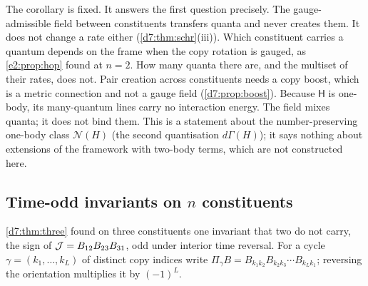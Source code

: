 The corollary is fixed. It answers the first question precisely. The gauge-admissible field between constituents transfers quanta and never
creates them. It does not change a rate either (\cref{d7:thm:schr}(iii)). Which constituent carries a quantum depends on the frame
when the copy rotation is gauged, as \cref{e2:prop:hop} found at $n=2$. How many quanta there are, and the multiset of their rates, does not.
Pair creation across constituents needs a copy boost, which is a metric connection and not a gauge field (\cref{d7:prop:boost}).
Because $\mathsf H$ is one-body, its many-quantum lines carry no interaction energy. The field mixes quanta; it does not bind them. This is a
statement about the number-preserving one-body class $\mathcal N(H)$ (the second quantisation $d\Gamma(H)$); it says nothing about extensions
of the framework with two-body terms, which are not constructed here.

\subsection{\texorpdfstring{Time-odd invariants on $n$ constituents}{Time-odd invariants on n constituents}}
\label{e4:sec:cycles}

\cref{d7:thm:three} found on three constituents one invariant that two do not carry, the sign of $\mathcal J=B_{12}B_{23}B_{31}$, odd under interior
time reversal. For a cycle $\gamma=(k_1,\dots,k_L)$ of distinct copy indices write $\Pi_\gamma B=B_{k_1k_2}B_{k_2k_3}\cdots B_{k_Lk_1}$; reversing the
orientation multiplies it by $(-1)^L$.

